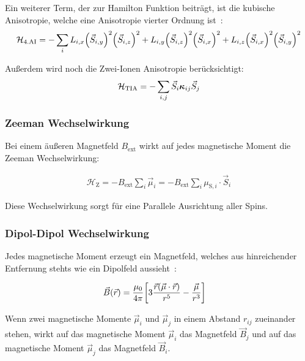 \documentclass[main.tex]{subfiles}
\begin{document}
Ein weiterer Term, der zur Hamilton Funktion beiträgt, ist die kubische Anisotropie, welche eine Anisotropie vierter Ordnung ist~\cite{GrossMarx}:
\begin{align}
	\mathcal{H}_{\text{4.AI}} = -\sum_{i} L_{i,x} \qty(\vec{S}_{i,y})^2 \qty(\vec{S}_{i,z})^2 
	+ L_{i,y} \qty(\vec{S}_{i,z})^2 \qty(\vec{S}_{i,x})^2 
	+ L_{i,z} \qty(\vec{S}_{i,x})^2 \qty(\vec{S}_{i,y})^2\label{eq:hamilton-4a}
\end{align}

Außerdem wird noch die Zwei-Ionen Anisotropie berücksichtigt:
\begin{align}
	\mathcal{H}_{\text{TIA}} = -\sum_{i,j} \vec{S}_i \bm{\mathrm{\kappa}}_{ij} \vec{S}_j\label{eq:hamilton-tia}
\end{align}
\subsubsection*{Zeeman Wechselwirkung}
Bei einem äußeren Magnetfeld \(B_\text{ext}\) wirkt auf jedes magnetische Moment die Zeeman Wechselwirkung:

\begin{align}
	\mathcal{H}_{\text{Z}} = - B_\text{ext} \sum_{i} \vec{\mu}_i = 
	- B_\text{ext} \sum_{i} \mu_{\text{S},i} \cdot \vec{S}_i\label{eq:hamilton-zeeman}
\end{align}

Diese Wechselwirkung sorgt für eine Parallele Ausrichtung aller Spins.

\subsubsection*{Dipol-Dipol Wechselwirkung}

Jedes magnetische Moment erzeugt ein Magnetfeld, welches aus hinreichender
Entfernung stehts wie ein Dipolfeld aussieht~\cite{Nolting-3-elektrodynamik}:

\begin{align}
	\vec{B}(\vec{r}) & = \frac{\mu_0}{4\pi} \qty[3 \frac{\vec{r}(\vec{\mu} \cdot
			\vec{r})}{r^5} - \frac{\vec{\mu}}{r^3}]\label{eq:dipolmoment}
\end{align}

Wenn zwei magnetische Momente \(\vec{\mu}_i\) und \(\vec{\mu}_j\) in einem Abstand \(r_{ij}\) zueinander stehen, wirkt auf das magnetische Moment \(\vec{\mu}_i\) das Magnetfeld \(\vec{B}_j\) und auf das magnetische Moment \(\vec{\mu}_j\) das Magnetfeld \(\vec{B}_i\).
\end{document}
